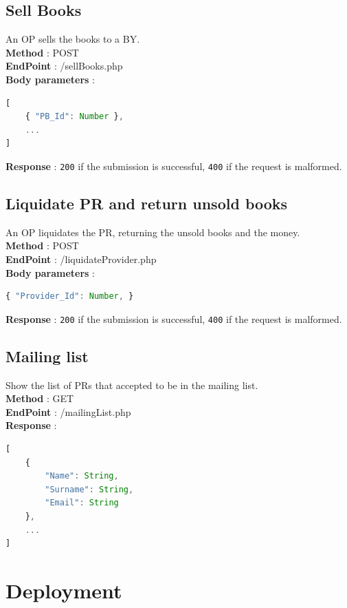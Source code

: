 \subsection{Sell Books}
An OP sells the books to a BY.\\
\textbf{Method} : POST \\
\textbf{EndPoint} : /sellBooks.php \\
\textbf{Body parameters} :
\begin{lstlisting}[language=JavaScript, label={lst:jscode}, basicstyle=\ttfamily]
[
    { "PB_Id": Number },
    ...
]
\end{lstlisting}
\textbf{Response} : \texttt{200} if the submission is successful, \texttt{400} if the request is malformed.

\subsection{Liquidate PR and return unsold books}
An OP liquidates the PR, returning the unsold books and the money.\\
\textbf{Method} : POST \\
\textbf{EndPoint} : /liquidateProvider.php \\
\textbf{Body parameters} :
\begin{lstlisting}[language=JavaScript, label={lst:jscode}, basicstyle=\ttfamily]
{ "Provider_Id": Number, }
\end{lstlisting}
\textbf{Response} : \texttt{200} if the submission is successful, \texttt{400} if the request is malformed.

\subsection{Mailing list}
Show the list of PRs that accepted to be in the mailing list.\\
\textbf{Method} : GET \\
\textbf{EndPoint} : /mailingList.php \\
\textbf{Response} :
\begin{lstlisting}[language=JavaScript, label={lst:jscode}, basicstyle=\ttfamily]
[
    {
        "Name": String,
        "Surname": String,
        "Email": String
    },
    ...
]
\end{lstlisting}


\section{Deployment}

